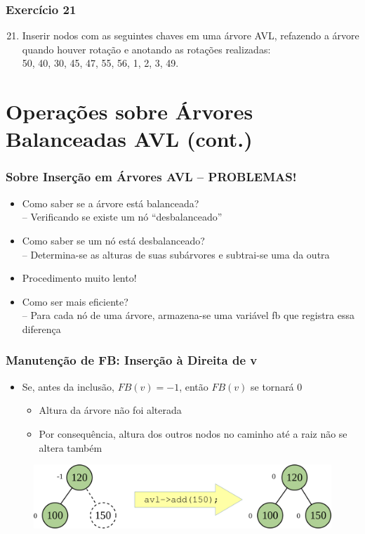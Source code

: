 \documentclass[aspectratio=169]{beamer}
\begin{document}
\begin{frame}[fragile]\frametitle{Exercício 21}
\begin{enumerate}
	\setcounter{enumi}{20}
	\item Inserir nodos com as seguintes chaves em uma árvore AVL, refazendo a árvore quando houver rotação e anotando as rotações realizadas:\\
50, 40, 30, 45, 47, 55, 56, 1, 2, 3, 49.
\end{enumerate}
\end{frame}

\section{Operações sobre Árvores Balanceadas AVL (cont.)}

\begin{frame}\frametitle{Sobre Inserção em Árvores AVL – PROBLEMAS!}
\begin{itemize}
	\item	Como saber se a árvore está balanceada?\\
		-- Verificando se existe um nó ``desbalanceado''
	\item	Como saber se um nó está desbalanceado?\\
		-- Determina-se as alturas de suas subárvores e subtrai-se uma da outra
	\item	Procedimento muito lento!
	\item	Como ser mais eficiente?\\
		-- Para cada nó de uma árvore, armazena-se uma variável fb que registra essa diferença
\end{itemize}
\end{frame}

\begin{frame}\frametitle{Manutenção de FB: Inserção à Direita de v}
\begin{itemize}
	\item Se, antes da inclusão, $FB(v) = -1$, então $FB(v)$ se tornará $0$
	\begin{itemize}
		\item Altura da árvore não foi alterada
		\item Por consequência, altura dos outros nodos no caminho até a raiz não se altera também
	\end{itemize}
\end{itemize}
\begin{figure}[h]
	\centering
	\includegraphics[height=0.22\paperheight]{imagens/avl_ins_dir1.png}
\end{figure}
\end{frame}
\end{document}
